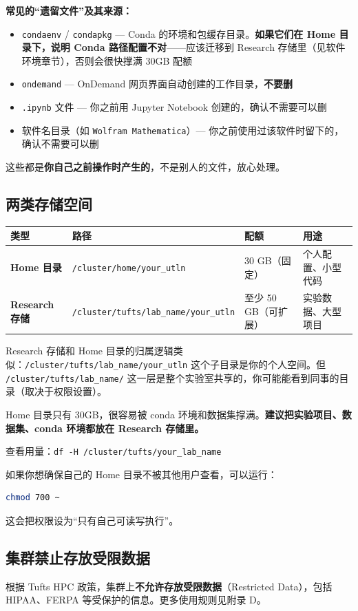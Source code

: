 \begin{tipbox}
\textbf{常见的``遗留文件''及其来源：}
\begin{itemize}[nosep]
  \item \texttt{condaenv} / \texttt{condapkg} — Conda 的环境和包缓存目录。\textbf{如果它们在 Home 目录下，说明 Conda 路径配置不对}——应该迁移到 Research 存储里（见软件环境章节），否则会很快撑满 30GB 配额
  \item \texttt{ondemand} — OnDemand 网页界面自动创建的工作目录，\textbf{不要删}
  \item \texttt{.ipynb} 文件 — 你之前用 Jupyter Notebook 创建的，确认不需要可以删
  \item 软件名目录（如 \texttt{Wolfram Mathematica}）— 你之前使用过该软件时留下的，确认不需要可以删
\end{itemize}
这些都是\textbf{你自己之前操作时产生的}，不是别人的文件，放心处理。
\end{tipbox}

\subsection{两类存储空间}

\begin{table}[h]
\centering
\begin{tabular}{lp{3cm}p{3cm}p{4cm}}
\toprule
类型 & 路径 & 配额 & 用途 \\
\midrule
\textbf{Home 目录} & \texttt{/cluster/home/\linebreak your\_utln} & 30 GB（固定） & 个人配置、小型代码 \\
\textbf{Research 存储} & \texttt{/cluster/tufts/\linebreak lab\_name/your\_utln} & 至少 50 GB（可扩展） & 实验数据、大型项目 \\
\bottomrule
\end{tabular}
\end{table}

Research 存储和 Home 目录的归属逻辑类似：\texttt{/cluster/tufts/lab\_name/your\_utln} 这个子目录是你的个人空间。但 \texttt{/cluster/tufts/lab\_name/} 这一层是整个实验室共享的，你可能能看到同事的目录（取决于权限设置）。

\begin{warnbox}
Home 目录只有 30GB，很容易被 conda 环境和数据集撑满。\textbf{建议把实验项目、数据集、conda 环境都放在 Research 存储里。}

查看用量：\texttt{df -H /cluster/tufts/your\_lab\_name}
\end{warnbox}

\begin{tipbox}
如果你想确保自己的 Home 目录不被其他用户查看，可以运行：
\begin{lstlisting}[language=bash]
chmod 700 ~
\end{lstlisting}
这会把权限设为``只有自己可读写执行''。
\end{tipbox}

\subsection{集群禁止存放受限数据}

根据 Tufts HPC 政策，集群上\textbf{不允许存放受限数据}（Restricted Data），包括 HIPAA、FERPA 等受保护的信息。更多使用规则见附录 D。
